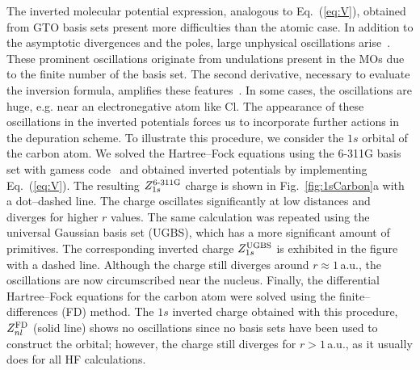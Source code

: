 \documentclass[10pt]{article}
\begin{document}
The inverted molecular potential expression, analogous to 
Eq.~(\ref{eq:V}), obtained from GTO basis sets present more 
difficulties than the atomic case. In addition to the asymptotic 
divergences and the poles, large unphysical oscillations 
arise~\cite{Schipper1997,Mura1997,Jacob2011,Gaiduk2013}. These 
prominent oscillations originate from undulations present in the MOs 
due to the finite number of the basis set. The second derivative, 
necessary to evaluate the inversion formula, amplifies these 
features~\cite{Schipper1997,Gaiduk2013}. In some cases, the 
oscillations are huge, e.g. near an electronegative atom like Cl. 
The appearance of these oscillations in the inverted potentials 
forces us to incorporate further actions in the depuration scheme. To 
illustrate this procedure, we consider the $1s$ orbital of the carbon 
atom. We solved the Hartree--Fock equations using the \mbox{6-311G} 
basis set with {\sc gamess} code~\cite{Schmidt1993,Gordon2005} and 
obtained inverted potentials by implementing Eq.~(\ref{eq:V}). 
The resulting $Z_{1s}^{\mbox{\scriptsize 6-311G}}$ charge is shown in 
Fig.~\ref{fig:1sCarbon}a with a dot--dashed line. 
The charge oscillates significantly at low distances and diverges for 
higher $r$ values. The same calculation was 
repeated using the universal Gaussian basis set (UGBS), which has a 
more significant amount of primitives. The corresponding inverted 
charge $Z_{1s}^{\mbox{\scriptsize UGBS}}$ is exhibited in the figure 
with a dashed line. 
Although the charge still diverges around $r\approx1\,$a.u., the 
oscillations are now circumscribed near the nucleus.
Finally, the differential Hartree--Fock equations for the carbon 
atom were solved using the finite--differences (FD) method. 
The $1s$ inverted charge obtained with this procedure, 
$Z_{nl}^{\mbox{\scriptsize FD}}$ (solid line) shows 
no oscillations since no basis sets have been used to construct the 
orbital; however, the charge still 
diverges for $r>1\,$a.u., as it usually does for all HF calculations.
\end{document}
